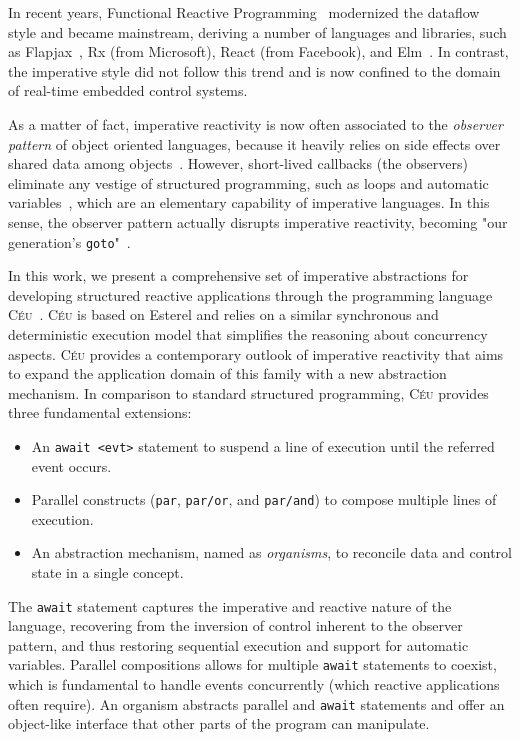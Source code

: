 \documentclass{acm_proc_article-sp}
\newcommand{\CEU}{\textsc{C\'{e}u}\xspace}
\newcommand{\code}[1] {{\small{\texttt{#1}}}}
\newcommand{\1}{\;}
\newcommand{\2}{\;\;}
\newcommand{\3}{\;\;\;}
\newcommand{\5}{\;\;\;\;\;}
\begin{document}
In recent years, Functional Reactive Programming~\cite{TODO} modernized the 
dataflow style and became mainstream, deriving a number of languages and 
libraries, such as Flapjax~\cite{TODO}, Rx (from Microsoft), React (from 
Facebook), and Elm~\cite{TODO}.
%
In contrast, the imperative style did not follow this trend and is now confined 
to the domain of real-time embedded control systems.

As a matter of fact, imperative reactivity is now often associated to the 
\emph{observer pattern} of object oriented languages, because it heavily relies 
on side effects over shared data among objects~\cite{TODO:deprecating,TODO2}.
%
However, short-lived callbacks (the observers) eliminate any vestige of 
structured programming, such as loops and automatic variables~\cite{TODO:adya}, 
which are an elementary capability of imperative languages.
%
In this sense, the observer pattern actually disrupts imperative reactivity, 
becoming "our generation's \code{goto}"~\cite{TODO:miguel,TODO:elm, 
TODO:dijkstra/goto}.


In this work, we present a comprehensive set of imperative abstractions for 
developing structured reactive applications through the programming language 
\CEU~\cite{ceu.sensys13}.
%
\CEU is based on Esterel and relies on a similar synchronous and deterministic 
execution model that simplifies the reasoning about concurrency aspects.
%
\CEU provides a contemporary outlook of imperative reactivity that aims to 
expand the application domain of this family with a new abstraction mechanism.
%
In comparison to standard structured programming, \CEU provides three 
fundamental extensions:

\begin{itemize}
\item An \code{await <evt>} statement to suspend a line of execution until the 
referred event occurs.
\item Parallel constructs (\code{par}, \code{par/or}, and \code{par/and}) to 
compose multiple lines of execution.
\item An abstraction mechanism, named as \emph{organisms}, to reconcile data 
and control state in a single concept.
\end{itemize}

The \code{await} statement captures the imperative and reactive nature of the 
language, recovering from the inversion of control inherent to the observer 
pattern, and thus restoring sequential execution and support for automatic 
variables.
Parallel compositions allows for multiple \code{await} statements to coexist, 
which is fundamental to handle events concurrently (which reactive applications 
often require).
An organism abstracts parallel and \code{await} statements and offer an 
object-like interface that other parts of the program can manipulate.
\end{document}
